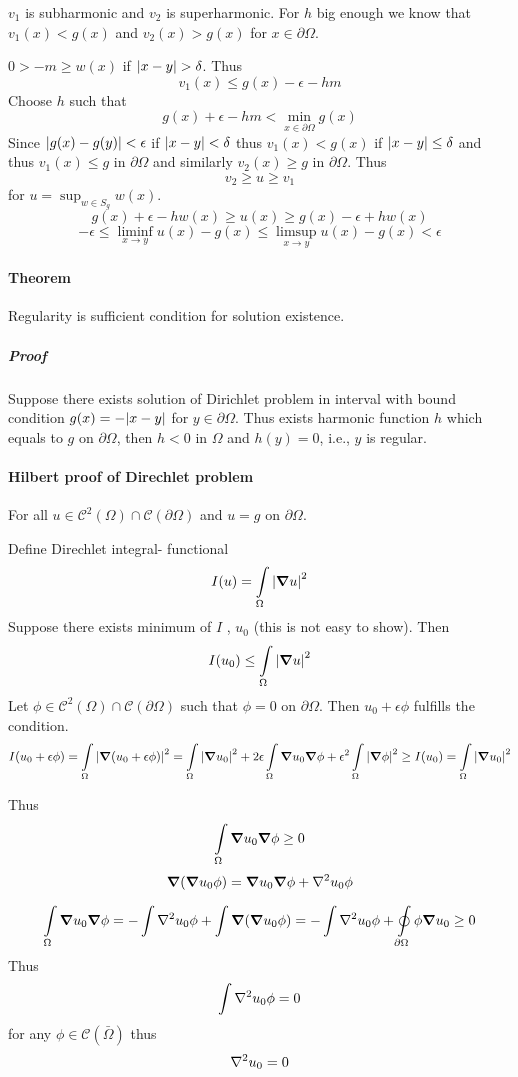 $v_1$ is subharmonic and $v_2$ is superharmonic. For $h$ big enough we know that $v_1(x) < g(x)$ and $v_2(x) > g(x)$ for $x\in \partial{\Omega}$.

$0> -m \geq w(x)$ if $\abs{x-y} > \delta$. Thus 
$$v_1(x) \leq g(x) - \epsilon - hm$$
Choose $h$ such that
$$g(x) + \epsilon - hm < \min\limits_{x\in \partial \Omega} g(x)$$
Since
$\abs{g(x) -g(y)}<\epsilon $ if $\abs{x-y} < \delta$ thus $v_1(x) < g(x) $  if $\abs{x-y} \leq \delta$ and thus $v_1(x) \leq g$ in $\partial \Omega$ and similarly $v_2(x) \geq g$ in $\partial \Omega$. Thus 
$$v_2 \geq u \geq v_1$$
for $u = \sup_{w \in S_g} w(x)$.
$$g(x) + \epsilon - hw(x) \geq u(x) \geq g(x) - \epsilon + hw(x)$$
$$-\epsilon \leq \liminf_{x\to y} u(x) - g(x) \leq \limsup_{x\to y} u(x) - g(x) < \epsilon$$
\paragraph{Theorem} Regularity is sufficient condition for solution existence.
\subparagraph{Proof} Suppose there exists solution of Dirichlet problem in interval with bound condition $g(x) = -\abs{x-y}$ for $y\in \partial \Omega$. Thus exists harmonic function $h$ which equals to $g$ on $\partial \Omega$, then $h<0$ in $\Omega$ and $h(y)=0$, i.e., $y$ is regular.

\paragraph{Hilbert proof of Direchlet problem}
For all $u \in \mathcal{C}^2(\Omega) \cap \mathcal{C}(\partial \Omega)$ and $u=g$ on $\partial \Omega$.

Define Direchlet integral- functional
$$I(u) = \int\limits_{\Omega} \abs{\grad{u}}^2$$
Suppose there exists minimum of $I$ , $u_0$ (this is not easy to show). Then
$$I(u_0) \leq \int\limits_{\Omega} \abs{\grad{u}}^2$$ 
Let $\phi\in \mathcal{C}^2(\Omega) \cap \mathcal{C}(\partial \Omega)$ such that $\phi=0$ on $\partial \Omega$. Then $u_0+\epsilon \phi$ fulfills the condition.
$$I(u_0+\epsilon \phi) = \int\limits_{\Omega} \abs{\grad(u_0+\epsilon \phi)}^2 = \int\limits_{\Omega} \abs{\grad{u_0}}^2 + 2\epsilon\int\limits_{\Omega} \grad{u_0}\grad{\phi}+ \epsilon^2\int\limits_{\Omega} \abs{\grad{\phi}}^2 \geq I(u_0) = \int\limits_{\Omega} \abs{\grad{u_0}}^2$$

Thus 
$$\int\limits_{\Omega} \grad{u_0}\grad{\phi} \geq 0$$
$$\grad(\grad{u_0}\phi) = \grad{u_0} \grad{\phi} + \laplacian{u_0} \phi$$

$$\int\limits_{\Omega} \grad{u_0}\grad{\phi} = -\int \laplacian{u_0} \phi + \int \grad(\grad{u_0}\phi) = - \int \laplacian{u_0} \phi + \oint\limits_{\partial \Omega} \phi \grad{u_0} \geq 0$$
Thus
$$\int \laplacian{u_0} \phi = 0$$
for any $\phi \in \mathcal{C}(\bar{\Omega})$ thus
$$\laplacian{u_0}=0$$
